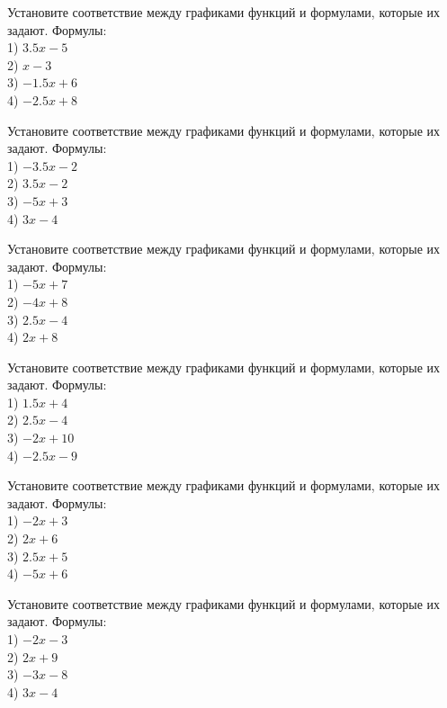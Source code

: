 \documentclass[4apaper]{article}
\begin{document}
\begin{taskBN}{19}
Установите соответствие между графиками функций и формулами, которые их задают. Формулы: \\1) $3.5x-5$\\2) $x-3$\\3) $-1.5x+6$\\4) $-2.5x+8$
\end{taskBN}

\begin{taskBN}{20}
Установите соответствие между графиками функций и формулами, которые их задают. Формулы: \\1) $-3.5x-2$\\2) $3.5x-2$\\3) $-5x+3$\\4) $3x-4$
\end{taskBN}

\begin{taskBN}{21}
Установите соответствие между графиками функций и формулами, которые их задают. Формулы: \\1) $-5x+7$\\2) $-4x+8$\\3) $2.5x-4$\\4) $2x+8$
\end{taskBN}

\begin{taskBN}{22}
Установите соответствие между графиками функций и формулами, которые их задают. Формулы: \\1) $1.5x+4$\\2) $2.5x-4$\\3) $-2x+10$\\4) $-2.5x-9$
\end{taskBN}

\begin{taskBN}{23}
Установите соответствие между графиками функций и формулами, которые их задают. Формулы: \\1) $-2x+3$\\2) $2x+6$\\3) $2.5x+5$\\4) $-5x+6$
\end{taskBN}

\begin{taskBN}{24}
Установите соответствие между графиками функций и формулами, которые их задают. Формулы: \\1) $-2x-3$\\2) $2x+9$\\3) $-3x-8$\\4) $3x-4$
\end{taskBN}
\end{document}
